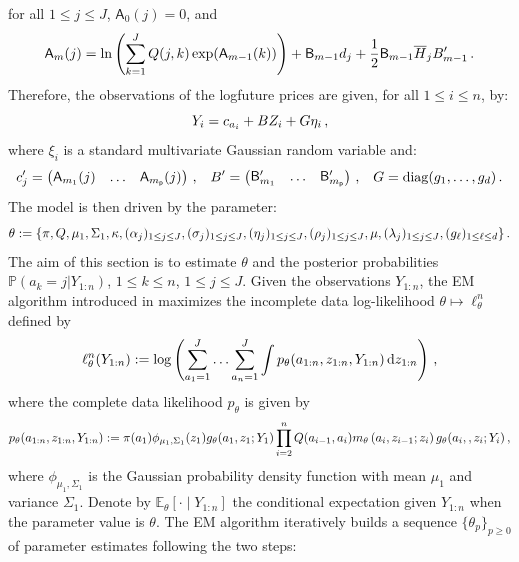 for all $1\le j\le J$, $\mathsf{A}_0(j) = 0$,  and
\begin{equation*}
\mathsf{A}_m(j) = \ln \left(\sum^J_{k=1} Q(j,k) \exp(\mathsf{A}_{m-1}(k)) \right) + \mathsf{B}_{m-1} d_j + \frac{1}{2} \mathsf{B}_{m-1} \overline{H}_j B'_{m-1}\,.
\end{equation*}
Therefore, the observations of the  logfuture prices are given, for all $1\le i\le n$, by: 
\[
Y_i = c_{a_i} + B Z_i + G \eta_i\,,
\] 
where $\xi_i$ is a standard multivariate Gaussian random variable and:
\[
c_{j}' = \begin{pmatrix} \mathsf{A}_{m_1}(j) & \ldots & \mathsf{A}_{m_{\mathsf{p}}}(j) \end{pmatrix}\,,
\;\;\;
B' = \begin{pmatrix}\mathsf{B}_{m_1}' &  \ldots & \mathsf{B}_{m_{\mathsf{p}}}' \end{pmatrix}\,, \;\;\;
G = \mathrm{diag}(g_1, \ldots , g_{d} )\,.
\]
The model is then driven by the parameter:
\[
\theta := \{\pi, Q, \mu_1, \Sigma_1, \kappa, (\alpha_j)_{1\leq j\leq J}, (\sigma_j)_{1\leq j\leq J}, (\eta_j)_{1\leq j\leq J}, (\rho_j)_{1\leq j\leq J}, \mu, (\lambda_j)_{1\leq j\leq J}, (g_{\ell})_{1\leq \ell\leq d} \}\,.
\]
The aim of this section is to estimate $\theta$ and the posterior probabilities $\mathbb{P}(a_k=j|Y_{1:n})$, $1\le k \le n$, $1\le j \le J$. Given the observations $Y_{1:n}$, the EM algorithm introduced in \cite{dempster:laird:rubin:1977} maximizes the incomplete data log-likelihood $\theta\mapsto \ell_{\theta}^{n}$ defined by
\begin{equation*}
\ell_{\theta}^{n}(Y_{1:n}) := \log\left(\sum_{a_1=1}^J\ldots\sum_{a_n=1}^J\int p_{\theta}(a_{1:n},z_{1:n},Y_{1:n})\,\mathrm{d} z_{1:n}\right)\,,
\end{equation*}
where the complete data likelihood $p_{\theta}$ is given by
\begin{equation*}
p_{\theta}(a_{1:n},z_{1:n},Y_{1:n}) := \pi(a_1)\phi_{\mu_1,\Sigma_1}(z_1)g_{\theta}(a_1,z_1;Y_1)\prod^{n}_{i=2}Q(a_{i-1},a_i)m_{\theta}\left(a_{i},z_{i-1};z_i\right)g_{\theta}(a_i,,z_i;Y_i)\,,
\end{equation*}
where $\phi_{\mu_1,\Sigma_1}$ is the Gaussian probability density function with mean $\mu_1$ and variance $\Sigma_1$.
Denote by $\mathbb{E}_{\theta}\left[\cdot\middle|Y_{1:n}\right]$  the conditional expectation given $Y_{1:n}$ when the parameter value is $\theta$. The EM algorithm iteratively builds a sequence $\{\theta_{p}\}_{p\ge 0}$ of parameter estimates following the two steps:
